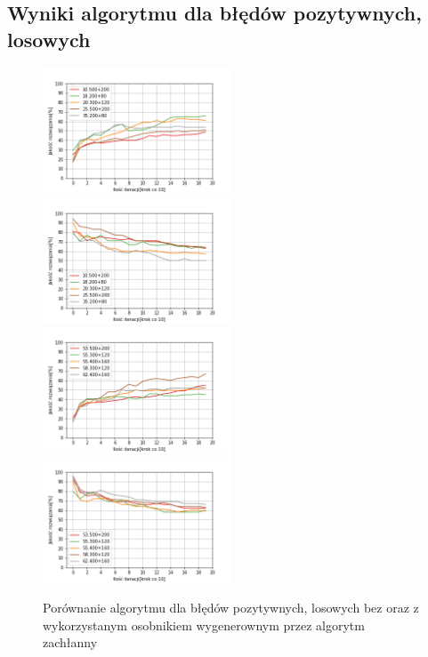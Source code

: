 \documentclass{article}
\begin{document}
\subsection{Wyniki algorytmu dla błędów pozytywnych, losowych}
\begin{figure}[H]
\includegraphics[width=0.5\textwidth]{poz-los1.png}
\includegraphics[width=0.5\textwidth]{poz-los-greedy1.png}
\includegraphics[width=0.5\textwidth]{poz-los2.png}
\includegraphics[width=0.5\textwidth]{poz-los-greedy2.png}
\caption{Porównanie algorytmu dla błędów pozytywnych, losowych bez oraz z wykorzystanym osobnikiem wygenerownym przez algorytm zachłanny}
\end{figure}
\end{document}
